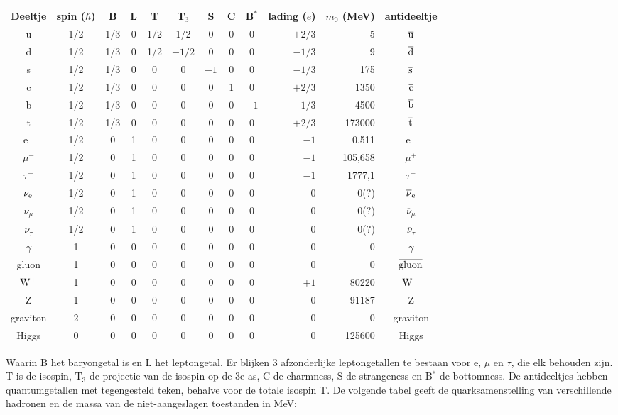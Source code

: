 \begin{center}
\begin{tabular}{||c|c@{}cccccccrr|c||}
\hline
Deeltje&spin ($\hbar$)&B&L&T&T$_3$&S&C&B$^*$&lading ($e$)&$m_0$ (MeV)&antideeltje\\
\hline
\hline
u&1/2&1/3&0&1/2&1/2   &0 &0 &0&$+2/3$&   5&$\overline{\rm u}$\\
d&1/2&1/3&0&1/2&$-1/2$&0 &0 &0&$-1/3$&   9&$\overline{\rm d}$\\
s&1/2&1/3&0&  0&0&$-1$&0 &0 &$-1/3$&   175&$\overline{\rm s}$\\
c&1/2&1/3&0&  0&0&0 &1 &0   &$+2/3$&  1350&$\overline{\rm c}$\\
b&1/2&1/3&0&  0&0&0 &0 &$-1$&$-1/3$&  4500&$\overline{\rm b}$\\
t&1/2&1/3&0&  0&0&0 &0 &0   &$+2/3$&173000&$\overline{\rm t}$\\
\hline
e$^-$        &1/2&0&1&0&0&0&0&0&$-1$&0,511&e$^+$\\
$\mu^-$      &1/2&0&1&0&0&0&0&0&$-1$&105,658&$\mu^+$\\
$\tau^-$     &1/2&0&1&0&0&0&0&0&$-1$&1777,1&$\tau^+$\\
$\nu_{\rm e}$&1/2&0&1&0&0&0&0&0&0&0(?)&$\overline{\nu}_{\rm e}$\\
$\nu_\mu$    &1/2&0&1&0&0&0&0&0&0&0(?)&$\overline{\nu}_{\mu}$\\
$\nu_\tau$   &1/2&0&1&0&0&0&0&0&0&0(?)&$\overline{\nu}_{\tau}$\\
\hline
$\gamma$ &1&0&0&0&0&0&0&0&$0$&0&$\gamma$\\
gluon    &1&0&0&0&0&0&0&0&$0$&0&$\overline{\rm gluon}$\\
$\rm W^+$&1&0&0&0&0&0&0&0&$+1$&80220&$\rm W^-$\\
Z        &1&0&0&0&0&0&0&0&$0$&91187&Z\\
graviton &2&0&0&0&0&0&0&0&$0$&0&graviton\\
\hline
Higgs    &0&0&0&0&0&0&0&0&$0$&125600&Higgs\\
\hline
\end{tabular}
\end{center}
Waarin B het baryongetal is en L het leptongetal. Er blijken 3 afzonderlijke
leptongetallen te bestaan voor e, $\mu$ en $\tau$, die elk behouden zijn. T
is de isospin, T$_3$ de projectie van de isospin op de 3e as, C de charmness,
S de strangeness en B$^*$ de bottomness. De antideeltjes hebben
quantumgetallen met tegengesteld teken, behalve voor de totale isospin T. De
volgende tabel geeft de quarksamenstelling van verschillende hadronen en de
massa van de niet-aangeslagen toestanden in MeV:
